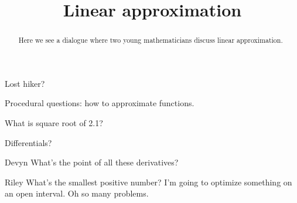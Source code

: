 \documentclass{ximera}
\title[Break-Ground:]{Linear approximation}
\begin{document}
\begin{abstract}
Here we see a dialogue where two young mathematicians discuss linear approximation.
\end{abstract}
\maketitle

Lost hiker?

Procedural questions: how to approximate functions.

What is square root of 2.1?

Differentials?


\begin{dialogue}
\item[Devyn] 
What's the point of all these derivatives?
\item[Riley]
What's the smallest positive number?
I'm going to optimize something on an open interval.  Oh so many problems.
\end{dialogue}


\end{document}
